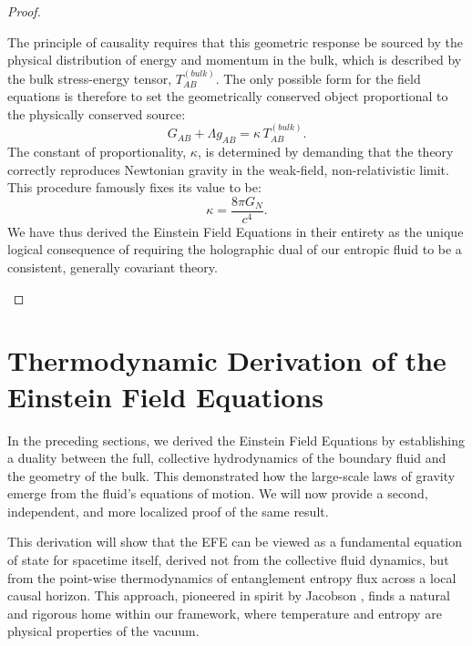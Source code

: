 \documentclass[11pt, letterpaper]{report}
\theoremstyle{plain} %
\theoremstyle{definition} %
\theoremstyle{remark} %
\begin{document}
\begin{proof}
\begin{enumerate}
    The principle of causality requires that this geometric response be sourced by the physical distribution of energy and momentum in the bulk, which is described by the bulk stress-energy tensor, $T_{AB}^{(bulk)}$. The only possible form for the field equations is therefore to set the geometrically conserved object proportional to the physically conserved source:
    \begin{equation}
        G_{AB} + \Lambda g_{AB} = \kappa \, T_{AB}^{(bulk)}.
    \end{equation}
    The constant of proportionality, $\kappa$, is determined by demanding that the theory correctly reproduces Newtonian gravity in the weak-field, non-relativistic limit. This procedure famously fixes its value to be:
    \begin{equation}
        \kappa = \frac{8\pi G_N}{c^4}.
    \end{equation}
    We have thus derived the Einstein Field Equations in their entirety as the unique logical consequence of requiring the holographic dual of our entropic fluid to be a consistent, generally covariant theory.
\end{enumerate}
\end{proof}
\section{Thermodynamic Derivation of the Einstein Field Equations}
\label{sec:efe_derivation_from_thermo}

In the preceding sections, we derived the Einstein Field Equations by establishing a duality between the full, collective hydrodynamics of the boundary fluid and the geometry of the bulk. This demonstrated how the large-scale laws of gravity emerge from the fluid's equations of motion. We will now provide a second, independent, and more localized proof of the same result.

This derivation will show that the EFE can be viewed as a fundamental equation of state for spacetime itself, derived not from the collective fluid dynamics, but from the point-wise thermodynamics of entanglement entropy flux across a local causal horizon. This approach, pioneered in spirit by Jacobson \cite{Jacobson1995Thermodynamics}, finds a natural and rigorous home within our framework, where temperature and entropy are physical properties of the vacuum.
\end{document}

